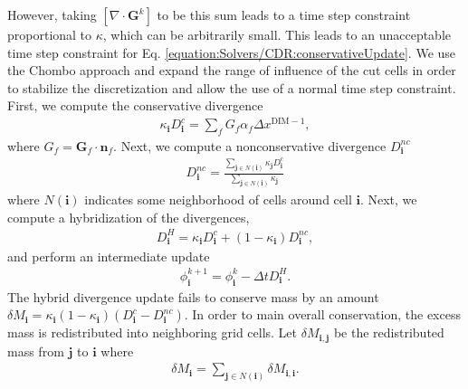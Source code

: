 \documentclass[letterpaper,10pt,english]{sphinxmanual}
\begin{document}
\sphinxAtStartPar
However, taking \([\nabla\cdot\mathbf{G}^k]\) to be this sum leads to a time step constraint proportional to \(\kappa\), which can be arbitrarily small.
This leads to an unacceptable time step constraint for Eq. \ref{equation:Solvers/CDR:conservativeUpdate}.
We use the Chombo approach and expand the range of influence of the cut cells in order to stabilize the discretization and allow the use of a normal time step constraint.
First, we compute the conservative divergence
\begin{equation*}
\begin{split}\kappa_{\mathbf{i}} D_\mathbf{i}^c =  \sum_f G_f\alpha_f\Delta x^{\textrm{DIM} -1},\end{split}
\end{equation*}
\sphinxAtStartPar
where \(G_f = \mathbf{G}_f\cdot \mathbf{n}_f\). Next, we compute a non\sphinxhyphen{}conservative divergence \(D_{\mathbf{i}}^{nc}\)
\begin{equation*}
\begin{split}D_\mathbf{i}^{nc} =  \frac{\sum_{\mathbf{j}\in{N}\left(\mathbf{i}\right)}\kappa_{\mathbf{j}}D_\mathbf{i}^c}{\sum_{\mathbf{j}\in{N}\left(\mathbf{i}\right)}\kappa_{\mathbf{j}}}\end{split}
\end{equation*}
\sphinxAtStartPar
where \(N(\mathbf{i})\) indicates some neighborhood of cells around cell \(\mathbf{i}\). Next, we compute a hybridization of the divergences,
\begin{equation*}
\begin{split}D_{\mathbf{i}}^H = \kappa_{\mathbf{i}} D_{\mathbf{i}}^c + (1-\kappa_{\mathbf{i}})D_{\mathbf{i}}^{nc},\end{split}
\end{equation*}
\sphinxAtStartPar
and perform an intermediate update
\begin{equation*}
\begin{split}\phi_{\mathbf{i}}^{k+1} = \phi_{\mathbf{i}}^k - \Delta tD_{\mathbf{i}}^H.\end{split}
\end{equation*}
\sphinxAtStartPar
The hybrid divergence update fails to conserve mass by an amount \(\delta M_{\mathbf{i}} = \kappa_{\mathbf{i}}\left(1-\kappa_{\mathbf{i}}\right)\left(D_{\mathbf{i}}^c - D_{\mathbf{i}}^{nc}\right)\).
In order to main overall conservation, the excess mass is redistributed into neighboring grid cells.
Let \(\delta M_{\mathbf{i}, \mathbf{j}}\) be the redistributed mass from \(\mathbf{j}\) to \(\mathbf{i}\) where
\begin{equation*}
\begin{split}\delta M_{\mathbf{i}} = \sum_{\mathbf{j} \in N(\mathbf{i})}\delta M_{\mathbf{i}, \mathbf{i}}.\end{split}
\end{equation*}
\end{document}
